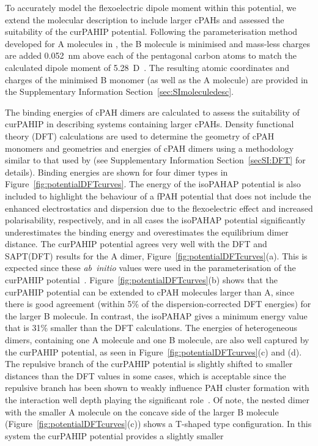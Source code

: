 To accurately model the flexoelectric dipole moment within this potential, we extend the molecular description to include larger cPAHs and assessed the suitability of the curPAHIP potential. Following the parameterisation method developed for A molecules in \citet{bowal2019ion}, the B molecule is minimised and mass-less charges are added 0.052~nm above each of the pentagonal carbon atoms to match the calculated dipole moment of 5.28~D~\cite{Martin2018flexo}. The resulting atomic coordinates and charges of the minimised B monomer (as well as the A molecule) are provided in the Supplementary Information Section~\ref{sec:SImoleculedesc}.

The binding energies of cPAH dimers are calculated to assess the suitability of curPAHIP in describing systems containing larger cPAHs. Density functional theory (DFT) calculations are used to determine the geometry of cPAH monomers and geometries and energies of cPAH dimers using a methodology similar to that used by \citet{Martin2018polar} (see Supplementary Information Section~\ref{secSI:DFT} for details). Binding energies are shown for four dimer types in Figure~\ref{fig:potentialDFTcurves}. The energy of the isoPAHAP potential is also included to highlight the behaviour of a fPAH potential that does not include the enhanced electrostatics and dispersion due to the flexoelectric effect and increased polarisability, respectively, and in all cases the isoPAHAP potential significantly underestimates the binding energy and overestimates the equilibrium dimer distance.
The curPAHIP potential agrees very well with the DFT and SAPT(DFT) results for the A dimer, Figure~\ref{fig:potentialDFTcurves}(a). This is expected since these \textit{ab~initio} values were used in the parameterisation of the curPAHIP potential~\cite{bowal2019ion}. 
Figure~\ref{fig:potentialDFTcurves}(b) shows that the curPAHIP potential can be extended to cPAH molecules larger than A, since there is good agreement (within 5\% of the dispersion-corrected DFT energies) for the larger B molecule. In contrast, the isoPAHAP gives a minimum energy value that is 31\% smaller than the DFT calculations.
The energies of heterogeneous dimers, containing one A molecule and one B molecule, are also well captured by the curPAHIP potential, as seen in Figure~\ref{fig:potentialDFTcurves}(c) and (d). The repulsive branch of the curPAHIP potential is slightly shifted to smaller distances than the DFT values in some cases, which is acceptable since the repulsive branch has been shown to weakly influence PAH cluster formation with the interaction well depth playing the significant role~\cite{Pascazio2017}. Of note, the nested dimer with the smaller A molecule on the concave side of the larger B molecule (Figure~\ref{fig:potentialDFTcurves}(c)) shows a T-shaped type configuration. In this system the curPAHIP potential provides a slightly smaller %
